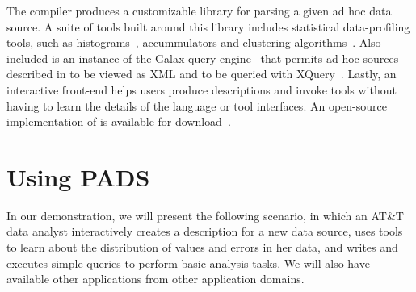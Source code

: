

The \pads{} compiler produces a customizable library for parsing a
given ad hoc data source.  A suite of tools built around this library
includes statistical data-profiling tools, such as
histograms~\cite{histograms}, accummulators and clustering
algorithms~\cite{quantiles}.  Also included is an instance of the
Galax query engine~\cite{galaxmanual} that permits ad hoc sources
described in \pads{} to be viewed as XML and to be queried with
XQuery~\cite{fernandez+:padx}.  Lastly, an interactive front-end helps
users produce \pads{} descriptions and invoke tools without having to
learn the details of the \pads{} language or tool interfaces.
  An open-source implementation of
\pads{} is available for download~\cite{padsmanual}.
\section{Using PADS}
\label{subsec:example}

In our demonstration, we will present the following scenario, in which
an AT\&T data analyst interactively creates a \pads{} description for
a new data source, uses \pads{} tools to learn about the distribution
of values and errors in her data, and writes and executes simple
queries to perform basic analysis tasks.  We will also have available other
\pads{} applications from other application domains.

